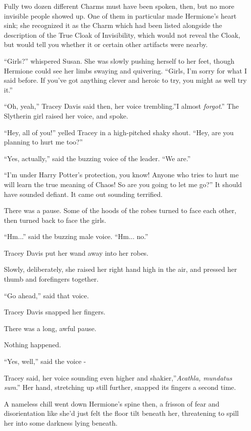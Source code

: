 Fully two dozen different Charms must have been spoken, then, but no
more invisible people showed up. One of them in particular made
Hermione's heart sink; she recognized it as the Charm which had been
listed alongside the description of the True Cloak of Invisibility,
which would not reveal the Cloak, but would tell you whether it or
certain other artifacts were nearby.

``Girls?'' whispered Susan. She was slowly pushing herself to her feet,
though Hermione could see her limbs swaying and quivering. ``Girls, I'm
sorry for what I said before. If you've got anything clever and heroic
to try, you might as well try it.''

``Oh, yeah,'' Tracey Davis said then, her voice trembling.''I almost
\emph{forgot}.'' The Slytherin girl raised her voice, and spoke.

``Hey, all of you!'' yelled Tracey in a high-pitched shaky shout. ``Hey,
are you planning to hurt me too?''

``Yes, actually,'' said the buzzing voice of the leader. ``We are.''

``I'm under Harry Potter's protection, you know! Anyone who tries to
hurt me will learn the true meaning of Chaos! So are you going to let me
go?'' It should have sounded defiant. It came out sounding terrified.

There was a pause. Some of the hoods of the robes turned to face each
other, then turned back to face the girls.

``Hm...'' said the buzzing male voice. ``Hm... no.''

Tracey Davis put her wand away into her robes.

Slowly, deliberately, she raised her right hand high in the air, and
pressed her thumb and forefingers together.

``Go ahead,'' said that voice.

Tracey Davis snapped her fingers.

There was a long, awful pause.

Nothing happened.

``Yes, well,'' said the voice -

Tracey said, her voice sounding even higher and shakier,''\emph{Acathla,
mundatus sum}.'' Her hand, stretching up still further, snapped its
fingers a second time.

A nameless chill went down Hermione's spine then, a frisson of fear and
disorientation like she'd just felt the floor tilt beneath her,
threatening to spill her into some darkness lying beneath.

